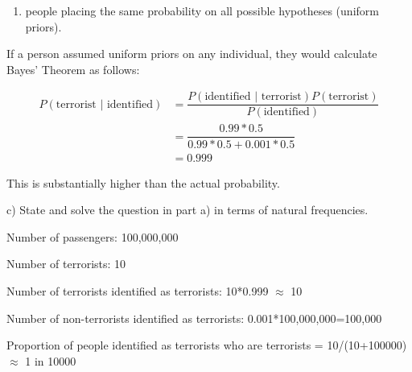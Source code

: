 \documentclass[
  letterpaper,
  DIV=11,
  numbers=noendperiod]{scrreprt}
\providecommand{\tightlist}{%
  \setlength{\itemsep}{0pt}\setlength{\parskip}{0pt}}\usepackage{longtable,booktabs,array}
\begin{document}
\begin{enumerate}
\def\labelenumi{\roman{enumi})}
\setcounter{enumi}{1}
\tightlist
\item
  people placing the same probability on all possible hypotheses
  (uniform priors).
\end{enumerate}

\begin{tcolorbox}[enhanced jigsaw, title=\textcolor{quarto-callout-tip-color}{\faLightbulb}\hspace{0.5em}{Answer}, toprule=.15mm, colback=white, breakable, titlerule=0mm, colframe=quarto-callout-tip-color-frame, coltitle=black, opacityback=0, rightrule=.15mm, colbacktitle=quarto-callout-tip-color!10!white, bottomtitle=1mm, opacitybacktitle=0.6, arc=.35mm, bottomrule=.15mm, toptitle=1mm, leftrule=.75mm, left=2mm]

If a person assumed uniform priors on any individual, they would
calculate Bayes' Theorem as follows:

\[
\begin{aligned}
P(\text{terrorist | identified}) &= \dfrac{P(\text{identified | terrorist})P(\text{terrorist})}{P(\text{identified})} \\[12 pt]
&= \dfrac{0.99*0.5}{0.99*0.5+0.001*0.5} \\[12 pt]
&= 0.999
\end{aligned}
\]

This is substantially higher than the actual probability.

\end{tcolorbox}

c) State and solve the question in part a) in terms of natural
frequencies.

\begin{tcolorbox}[enhanced jigsaw, title=\textcolor{quarto-callout-tip-color}{\faLightbulb}\hspace{0.5em}{Answer}, toprule=.15mm, colback=white, breakable, titlerule=0mm, colframe=quarto-callout-tip-color-frame, coltitle=black, opacityback=0, rightrule=.15mm, colbacktitle=quarto-callout-tip-color!10!white, bottomtitle=1mm, opacitybacktitle=0.6, arc=.35mm, bottomrule=.15mm, toptitle=1mm, leftrule=.75mm, left=2mm]

Number of passengers: 100,000,000

Number of terrorists: 10

Number of terrorists identified as terrorists: 10*0.999 \(\approx\) 10

Number of non-terrorists identified as terrorists:
0.001*100,000,000=100,000

Proportion of people identified as terrorists who are terrorists =
10/(10+100000) \(\approx\) 1 in 10000

\end{tcolorbox}
\end{document}
